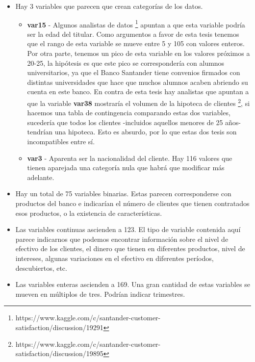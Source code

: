 \documentclass[11pt,a4paper,spanish]{article} %
\begin{document}
\begin{itemize}
  \item{Hay 3 variables que parecen que crean categorías de los datos.}
  
  \begin{itemize}
      \item{\textbf{var15} - Algunos analistas de datos \footnote{https://www.kaggle.com/c/santander-customer-satisfaction/discussion/19291} apuntan a que esta variable podría ser la edad del titular. Como argumentos a favor de esta tesis tenemos que el rango de esta variable se mueve entre 5 y 105 con valores enteros. Por otra parte, tenemos un pico de esta variable en los valores próximos a 20-25, la hipótesis es que este pico se correspondería con alumnos universitarios, ya que el Banco Santander tiene convenios firmados con distintas universidades que hace que muchos alumnos acaben abriendo su cuenta en este banco. En contra de esta tesis hay analistas que apuntan a que la variable \textbf{var38} mostraría el volumen de la hipoteca de clientes \footnote{https://www.kaggle.com/c/santander-customer-satisfaction/discussion/19895}, si hacemos una tabla de contingencia comparando estas dos variables, sucedería que todos los clientes -incluidos aquellos menores de 25 años- tendrían una hipoteca. Esto es absurdo, por lo que estas dos tesis son incompatibles entre sí.}
      
      \item {\textbf{var3} - Aparenta ser la nacionalidad del cliente. Hay 116 valores que tienen aparejada una categoría nula que habrá que modificar más adelante.}
    \end{itemize}
  
    \item{Hay un total de 75 variables binarias. Estas parecen corresponderse con productos del banco e indicarían el número de clientes que tienen contratados esos productos, o la existencia de características.}

  \item{Las variables continuas ascienden a 123. El tipo de variable contenida aquí parece indicarnos que podemos encontrar información sobre el nivel de efectivo de los clientes, el dinero que tienen en diferentes productos, nivel de intereses, algunas variaciones en el efectivo en diferentes períodos, descubiertos, etc. }
  
    \item{Las variables enteras ascienden a 169. Una gran cantidad de estas variables se mueven en múltiplos de tres. Podrían indicar trimestres.}
    

\end{itemize}
\end{document}
